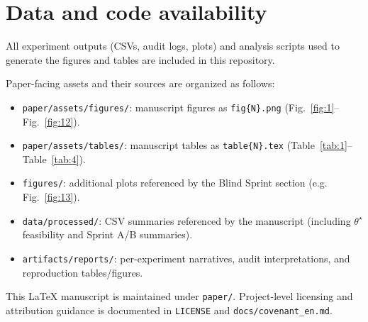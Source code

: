 \section{Data and code availability}

All experiment outputs (CSVs, audit logs, plots) and analysis scripts used to generate the figures and tables are included in this repository.

Paper-facing assets and their sources are organized as follows:
\begin{itemize}
  \item \texttt{paper/assets/figures/}: manuscript figures as \texttt{fig\{N\}.png} (Fig.~\ref{fig:1}--Fig.~\ref{fig:12}).
  \item \texttt{paper/assets/tables/}: manuscript tables as \texttt{table\{N\}.tex} (Table~\ref{tab:1}--Table~\ref{tab:4}).
  \item \texttt{figures/}: additional plots referenced by the Blind Sprint section (e.g. Fig.~\ref{fig:13}).
  \item \texttt{data/processed/}: CSV summaries referenced by the manuscript (including $\theta^\star$ feasibility and Sprint A/B summaries).
  \item \texttt{artifacts/reports/}: per-experiment narratives, audit interpretations, and reproduction tables/figures.
\end{itemize}

This LaTeX manuscript is maintained under \texttt{paper/}. Project-level licensing and attribution guidance is documented in \texttt{LICENSE} and \texttt{docs/covenant\_en.md}.
